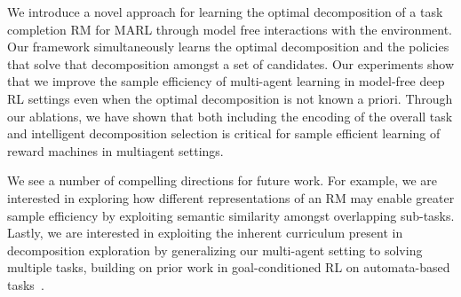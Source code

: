 We introduce a novel approach for learning the optimal decomposition of a task completion RM for MARL through model free interactions with the environment. Our framework 
simultaneously learns the optimal decomposition and the policies that solve that decomposition amongst a set of candidates. Our experiments show that we improve the sample efficiency of multi-agent learning in model-free deep RL settings even when the optimal decomposition is not known a priori. 
Through our ablations, we have shown that both including the encoding of the overall task and intelligent decomposition selection is critical for sample efficient learning of reward machines in multiagent settings. 

We see a number of compelling directions for future work. For example, we are interested in exploring how different representations of an RM may enable greater sample efficiency by exploiting semantic similarity amongst overlapping sub-tasks. 
Lastly, we are interested in exploiting the inherent curriculum present in decomposition exploration by generalizing our multi-agent setting to solving multiple tasks, building on prior work in goal-conditioned RL on automata-based tasks~\cite{vaezipoor2021ltl2action, qiu2023gcrlltl}.